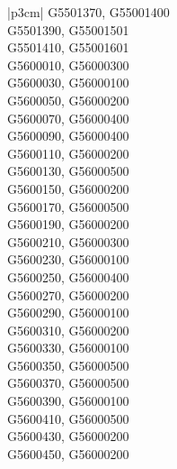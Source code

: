 \begin{customLongTable}{ |p{3cm}| }
G5501370, G55001400 \\ \hline
G5501390, G55001501 \\ \hline
G5501410, G55001601 \\ \hline
G5600010, G56000300 \\ \hline
G5600030, G56000100 \\ \hline
G5600050, G56000200 \\ \hline
G5600070, G56000400 \\ \hline
G5600090, G56000400 \\ \hline
G5600110, G56000200 \\ \hline
G5600130, G56000500 \\ \hline
G5600150, G56000200 \\ \hline
G5600170, G56000500 \\ \hline
G5600190, G56000200 \\ \hline
G5600210, G56000300 \\ \hline
G5600230, G56000100 \\ \hline
G5600250, G56000400 \\ \hline
G5600270, G56000200 \\ \hline
G5600290, G56000100 \\ \hline
G5600310, G56000200 \\ \hline
G5600330, G56000100 \\ \hline
G5600350, G56000500 \\ \hline
G5600370, G56000500 \\ \hline
G5600390, G56000100 \\ \hline
G5600410, G56000500 \\ \hline
G5600430, G56000200 \\ \hline
G5600450, G56000200 \\
\end{customLongTable}
